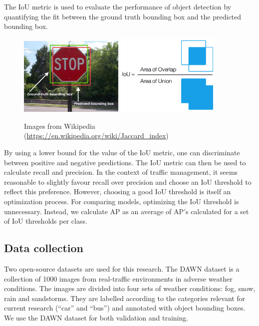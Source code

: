 \documentclass[]{article}
\begin{document}
	The IoU metric is used to evaluate the performance of object detection by quantifying the fit between the ground truth bounding box and the predicted bounding box.
	
	\begin{figure}[h]
		\centering
		\includegraphics[width=5cm]{Intersection_over_Union_-_object_detection_bounding_boxes.jpg}
		\includegraphics[width=5cm]{Intersection_over_Union_-_visual_equation.png}
		\caption{Images from Wikipedia \footnotesize{(\url{https://en.wikipedia.org/wiki/Jaccard_index})}}
	\end{figure}
	
	By using a lower bound for the value of the IoU metric, one can discriminate between positive and negative predictions. The IoU metric can then be used to calculate recall and precision. In the context of traffic management, it seems reasonable to slightly favour recall over precision and choose an IoU threshold to reflect this preference. However, choosing a good IoU threshold is itself an optimization process. For comparing models, optimizing the IoU threshold is unnecessary. Instead, we calculate AP as an average of AP's calculated for a set of IoU thresholds per class.

\subsection{Data collection}

	Two open-source datasets are used for this research. The DAWN dataset \cite{bw1x-yh39-20} is a collection of 1000 images from real-traffic environments in adverse weather conditions. The images are divided into four sets of weather conditions: fog, snow, rain and sandstorms. They are labelled according to the categories relevant for current research (``car'' and ``bus'') and annotated with object bounding boxes. We use the DAWN dataset for both validation and training.
	
\end{document}
